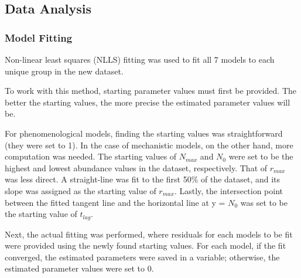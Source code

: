\documentclass[11pt]{article}
\begin{document}
\begin{linenumbers}
	\subsection{Data Analysis}
	\subsubsection{Model Fitting}
	\par Non-linear least squares (NLLS) fitting was used to fit all 7 models to each unique group in the new dataset. 
	\par To work with this method, starting parameter values must first be provided. The better the starting values, the more precise the estimated parameter values will be.
	\par For phenomenological models, finding the starting values was straightforward (they were set to 1). In the case of mechanistic models, on the other hand, more computation was needed. The starting values of $N_{max}$ and $N_0$ were set to be the highest and lowest abundance values in the dataset, respectively. That of $r_{max}$ was less direct. A straight-line was fit to the first 50\% of the dataset, and its slope was assigned as the starting value of $r_{max}$. Lastly, the intersection point between the fitted tangent line and the horizontal line at y = $N_0$ was set to be the starting value of $t_{lag}$.
	\par Next, the actual fitting was performed, where residuals for each models to be fit were provided using the newly found starting values. For each model, if the fit converged, the estimated parameters were saved in a variable; otherwise, the estimated parameter values were set to 0. 

\end{linenumbers}
\end{document}
